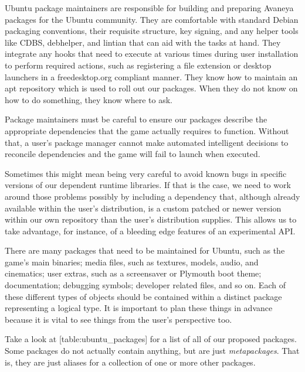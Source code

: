 
Ubuntu package maintainers are responsible for building and preparing Avaneya packages for the Ubuntu community. They are comfortable with standard Debian packaging conventions, their requisite structure, key signing, and any helper tools like CDBS, debhelper, and lintian that can aid with the tasks at hand. They integrate any hooks that need to execute at various times during user installation to perform required actions, such as registering a file extension or desktop launchers in a freedesktop.org compliant manner. They know how to maintain an apt repository which is used to roll out our packages. When they do not know on how to do something, they know where to ask.

Package maintainers must be careful to ensure our packages describe the appropriate dependencies that the game actually requires to function. Without that, a user's package manager cannot make automated intelligent decisions to reconcile dependencies and the game will fail to launch when executed.

Sometimes this might mean being very careful to avoid known bugs in specific versions of our dependent runtime libraries. If that is the case, we need to work around those problems possibly by including a dependency that, although already available within the user's distribution, is a custom patched or newer version within our own repository than the user's distribution supplies. This allows us to take advantage, for instance, of a bleeding edge features of an experimental API.

There are many packages that need to be maintained for Ubuntu, such as the game's main binaries; media files, such as textures, models, audio, and cinematics; user extras, such as a screensaver or Plymouth boot theme; documentation; debugging symbols; developer related files, and so on. Each of these different types of objects should be contained within a distinct package representing a logical type. It is important to plan these things in advance because it is vital to see things from the user's perspective too.

Take a look at [table:ubuntu_packages] for a list of all of our proposed packages. Some packages do not actually contain anything, but are just {\it metapackages}. That is, they are just aliases for a collection of one or more other packages. 
\crlf


